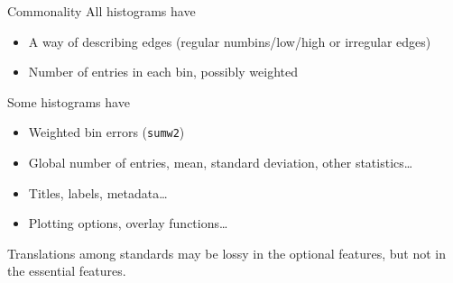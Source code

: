 \documentclass[aspectratio=169]{beamer}
\begin{document}
\begin{frame}{Commonality}
\large
\vspace{0.5 cm}
All histograms have
\begin{itemize}
\item A way of describing edges (regular numbins/low/high or irregular edges)
\item Number of entries in each bin, possibly weighted
\end{itemize}

\vspace{0.5 cm}
Some histograms have
\begin{itemize}
\item Weighted bin errors (\texttt{sumw2})
\item Global number of entries, mean, standard deviation, other statistics\ldots
\item Titles, labels, metadata\ldots
\item Plotting options, overlay functions\ldots
\end{itemize}

\vspace{0.5 cm}
Translations among standards may be lossy in the optional features, but not in the essential features.
\end{frame}
\end{document}
